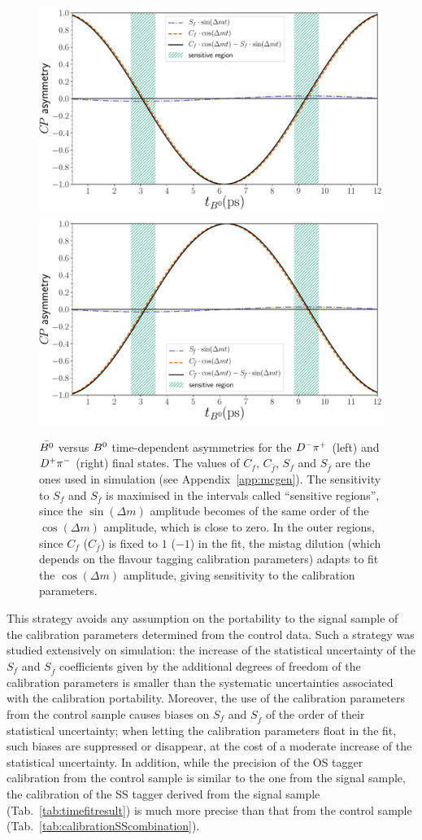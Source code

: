 \begin{figure}[t]
        \begin{center}
                \includegraphics[width=0.48\linewidth]{04Flavourtagging/figs/oscillation_f.pdf}
                \includegraphics[width=0.48\linewidth]{04Flavourtagging/figs/oscillation_fbar.pdf}
        \end{center}
        \vspace{-2mm}
        \caption{$\bar{B^0}$ versus $B^0$ time-dependent asymmetries for the $D^-\pi^+$ (left) and $D^+\pi^-$
        (right) final states. The values of $C_f$, $C_{\bar f}$, $S_f$ and $S_{\bar f}$ are the ones used in simulation (see Appendix~\ref{app:mcgen}). 
        The sensitivity to $S_f$ and $S_{\bar f}$ is maximised in the
        intervals called ``sensitive regions'', since the $\sin(\Delta m)$ amplitude becomes of the same order of
        the $\cos(\Delta m)$ amplitude, which is close to zero. In the outer regions, since $C_f$ ($C_{\bar f}$) is
        fixed to $1$ ($-1$) in the fit, the mistag dilution (which depends on the flavour tagging calibration
        parameters) adapts to fit the $\cos(\Delta m)$ amplitude, giving sensitivity to the calibration parameters.}
        \label{fig:amplitudes}
\end{figure}
This strategy avoids any assumption on the portability
to the signal sample of the calibration parameters determined from the control
data. Such a strategy was studied extensively on simulation: the increase of the
statistical uncertainty of the $S_f$ and $S_{\bar{f}}$ coefficients given by the additional degrees of freedom of
the calibration parameters is smaller than the systematic
uncertainties associated with the calibration portability. Moreover,
the use of the calibration parameters from the control sample
causes biases on $S_f$ and $S_{\bar{f}}$ of the order of their statistical uncertainty; when letting
the calibration parameters float in the fit, such biases are suppressed or disappear, at the cost
of a moderate increase of the statistical uncertainty. In addition, while the precision
of the OS tagger calibration from the control sample is similar to the one from the
signal sample, the calibration of the SS tagger derived from the signal sample (Tab.~\ref{tab:timefitresult})
is much more precise than that from the control sample (Tab.~\ref{tab:calibrationSScombination}).


